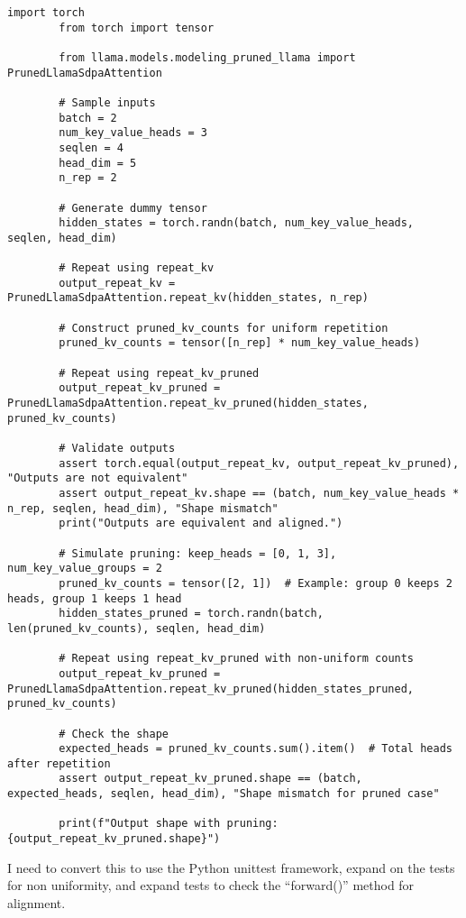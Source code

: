 \documentclass{article}
\begin{document}
    \begin{lstlisting}[label={lst:tests}]
        import torch
        from torch import tensor

        from llama.models.modeling_pruned_llama import PrunedLlamaSdpaAttention

        # Sample inputs
        batch = 2
        num_key_value_heads = 3
        seqlen = 4
        head_dim = 5
        n_rep = 2

        # Generate dummy tensor
        hidden_states = torch.randn(batch, num_key_value_heads, seqlen, head_dim)

        # Repeat using repeat_kv
        output_repeat_kv = PrunedLlamaSdpaAttention.repeat_kv(hidden_states, n_rep)

        # Construct pruned_kv_counts for uniform repetition
        pruned_kv_counts = tensor([n_rep] * num_key_value_heads)

        # Repeat using repeat_kv_pruned
        output_repeat_kv_pruned = PrunedLlamaSdpaAttention.repeat_kv_pruned(hidden_states, pruned_kv_counts)

        # Validate outputs
        assert torch.equal(output_repeat_kv, output_repeat_kv_pruned), "Outputs are not equivalent"
        assert output_repeat_kv.shape == (batch, num_key_value_heads * n_rep, seqlen, head_dim), "Shape mismatch"
        print("Outputs are equivalent and aligned.")

        # Simulate pruning: keep_heads = [0, 1, 3], num_key_value_groups = 2
        pruned_kv_counts = tensor([2, 1])  # Example: group 0 keeps 2 heads, group 1 keeps 1 head
        hidden_states_pruned = torch.randn(batch, len(pruned_kv_counts), seqlen, head_dim)

        # Repeat using repeat_kv_pruned with non-uniform counts
        output_repeat_kv_pruned = PrunedLlamaSdpaAttention.repeat_kv_pruned(hidden_states_pruned, pruned_kv_counts)

        # Check the shape
        expected_heads = pruned_kv_counts.sum().item()  # Total heads after repetition
        assert output_repeat_kv_pruned.shape == (batch, expected_heads, seqlen, head_dim), "Shape mismatch for pruned case"

        print(f"Output shape with pruning: {output_repeat_kv_pruned.shape}")
    \end{lstlisting}

    I need to convert this to use the Python unittest framework, expand on the tests for non uniformity, and expand tests to check the ``forward()'' method for alignment.
\end{document}
